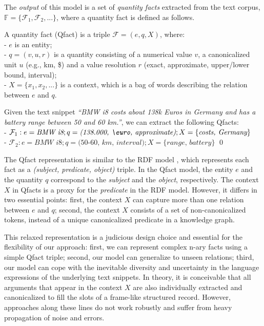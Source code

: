 The \textit{output} of this model is a set of \textit{quantity facts} extracted from the text corpus, $\mathbb{F} =\{\mathcal{F}_1, \mathcal{F}_2, ...\}$, where a quantity fact is defined as follows.


\begin{definition} A quantity fact (Qfact) is a triple $\mathcal{F} = (e,q,X)$, where: \\
- $e$ is an entity;\\
- $q = (v,u,r)$ is a quantity consisting of a numerical value $v$, a canonicalized unit $u$ (e.g., km, \$) and a value resolution $r$ (exact, approximate, upper/lower bound, %
interval);\\
- $X = \{x_1,x_2,...\}$ is a context, which is a bag of words describing the relation between $e$ and $q$.
\end{definition}


\begin{example}
Given the text snippet \textit{``BMW i8 costs about 138k Euros in Germany and has a battery range between 50 and 60 km.''}, we can extract the following Qfacts:\\
- $\mathcal{F}_1: e=\textit{BMW i8}; q=\textit{(138.000, \euro, approximate)}; X = \{\textit{costs, Germany}\}$\\
- $\mathcal{F}_2: e=\textit{BMW i8}; q=\textit{(50-60, km, interval)}; X = \{\textit{range, battery}\}$ 
\qed 
\end{example}


The Qfact representation is similar to the RDF model
\cite{rdf}, 
which
represents each fact as a \textit{(subject, predicate, object)} triple.  In  the Qfact model,  the  entity $e$ and the quantity $q$  correspond to the \textit{subject} and the \textit{object}, respectively. 
The context $X$ in Qfacts is a proxy for the \textit{predicate} in the RDF model. However, it differs in two essential points: first, the context $X$ can capture more than one relation between $e$ and $q$; second, the context $X$ consists of a set of non-canonicalized tokens, instead of a unique canonicalized predicate in a knowledge graph. 

This relaxed representation is a judicious design choice and
essential for the flexibility of our approach: first, we can represent complex n-ary facts using a simple Qfact triple; second, our model can generalize to unseen relations; third, our model can cope with the 
inevitable diversity
and uncertainty in the language expressions of the underlying
text snippets. 
In theory, it is conceivable that all arguments that appear in
the context $X$ are also individually extracted and canonicalized
 to fill the slots of a frame-like structured record.
However, approaches along these lines do not work robustly and
suffer from heavy propagation of noise and errors.


